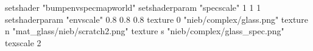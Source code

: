 setshader "bumpenvspecmapworld"
setshaderparam "specscale" 1 1 1
setshaderparam "envscale"  0.8 0.8 0.8
    texture 0 "nieb/complex/glass.png"
    texture n "mat_glass/nieb/scratch2.png"
    texture s "nieb/complex/glass_spec.png"
    texscale 2